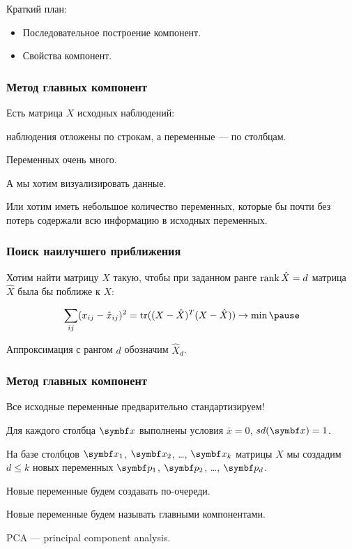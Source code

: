 
\begin{frame} %


\end{frame}



\begin{frame}{Краткий план:}
  \begin{itemize}[<+->]
    \item Последовательное построение компонент.
    \item Свойства компонент.
  \end{itemize}

\end{frame}




\begin{frame}
  \frametitle{Метод главных компонент}


  Есть матрица $X$ исходных наблюдений:

  наблюдения отложены по строкам, а переменные — по столбцам. 


  Переменных очень много. 


  А мы хотим визуализировать данные. 


  Или хотим иметь небольшое количество переменных, которые бы почти без потерь 
  содержали всю информацию в исходных переменных. 


\end{frame}


\begin{frame}
  \frametitle{Поиск наилучшего приближения}

  Хотим найти матрицу $\hat X$ такую, чтобы
  при заданном ранге $\rank \hat X = d$ матрица $\hat X$ была бы поближе к $X$:

  \[
  \sum_{ij} (x_{ij} - \hat x_{ij})^2 = \trace ((X - \hat X)^T (X - \hat X)) \to \min \pause 
  \]

  Аппроксимация с рангом $d$ обозначим $\hat X_d$.
  
\end{frame}


\begin{frame}
  \frametitle{Метод главных компонент}

  Все исходные переменные предварительно стандартизируем! 

  Для каждого столбца $\bx$ выполнены условия $\bar x =0$, $sd(\bx)=1$. 


  На базе столбцов $\bx_1$, $\bx_2$, \ldots, $\bx_k$ матрицы $X$ мы создадим 
  $d\leq k$ новых переменных $\bp_1$, $\bp_2$, \ldots, $\bp_d$. 

  Новые переменные будем создавать по-очереди. 

  Новые переменные будем называть \alert{главными компонентами}.

  PCA — \alert{principal component analysis}.

\end{frame}


